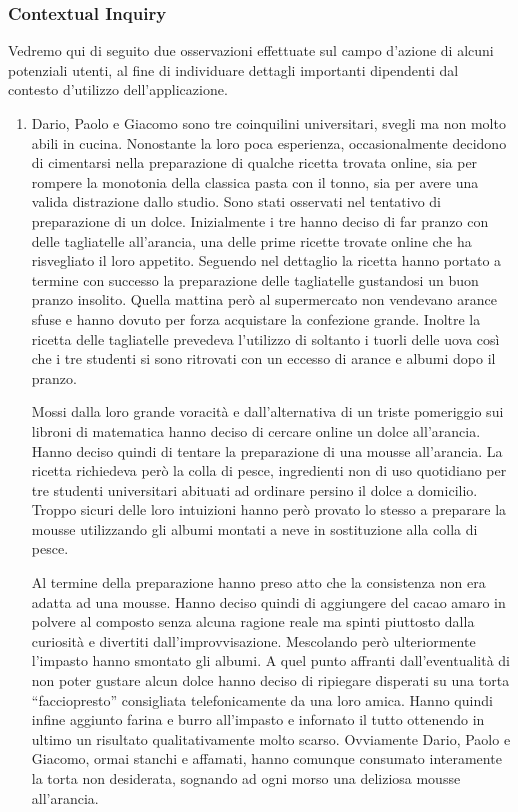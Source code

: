 \subsubsection{Contextual Inquiry}
Vedremo qui di seguito due osservazioni effettuate sul campo d'azione
di alcuni potenziali utenti, al fine di individuare dettagli importanti
dipendenti dal contesto d'utilizzo dell'applicazione.

\begin{enumerate}
\item Dario, Paolo e Giacomo sono tre coinquilini universitari, svegli ma non molto
abili in cucina. Nonostante la loro poca esperienza, occasionalmente
decidono di cimentarsi nella preparazione di qualche ricetta trovata
online, sia per rompere la monotonia della classica pasta con il tonno,
sia per avere una valida distrazione dallo studio.
Sono stati osservati nel tentativo di preparazione di un dolce.
Inizialmente i tre hanno deciso di far pranzo con delle
tagliatelle all'arancia, una delle prime ricette trovate online che ha risvegliato il
loro appetito. Seguendo nel dettaglio la ricetta hanno portato a termine
con successo la preparazione delle tagliatelle gustandosi un buon
pranzo insolito. 
Quella mattina però al supermercato non vendevano
arance sfuse e hanno dovuto per forza acquistare la confezione grande.
Inoltre la ricetta delle tagliatelle prevedeva l'utilizzo di soltanto i
tuorli delle uova così che i tre studenti si sono ritrovati con un
eccesso di arance e albumi dopo il pranzo.

Mossi dalla loro grande voracità e dall'alternativa di un triste pomeriggio sui libroni di
matematica hanno deciso di cercare online un dolce all'arancia.
Hanno deciso quindi di tentare la preparazione di una mousse
all'arancia. La ricetta richiedeva però la colla di pesce, ingredienti non di uso
quotidiano per tre studenti universitari abituati ad ordinare persino il
dolce a domicilio. Troppo sicuri delle loro intuizioni hanno però
provato lo stesso a preparare la mousse utilizzando gli albumi montati a
neve in sostituzione alla colla di pesce. 

Al termine della preparazione hanno preso atto che la consistenza non era adatta ad una mousse. 
Hanno deciso quindi di aggiungere del cacao amaro in
polvere al composto senza alcuna ragione reale ma spinti piuttosto dalla curiosità e divertiti
dall'improvvisazione. Mescolando però ulteriormente l'impasto hanno smontato
gli albumi. A quel punto affranti dall'eventualità di non poter gustare
alcun dolce hanno deciso di ripiegare disperati su una torta
``facciopresto'' consigliata telefonicamente da una loro amica. Hanno
quindi infine aggiunto farina e burro all'impasto e infornato il tutto
ottenendo in ultimo un risultato qualitativamente molto scarso.
Ovviamente Dario, Paolo e Giacomo, ormai stanchi e affamati, hanno comunque consumato interamente la
torta non desiderata, sognando ad ogni morso una deliziosa mousse all'arancia.


\end{enumerate}
